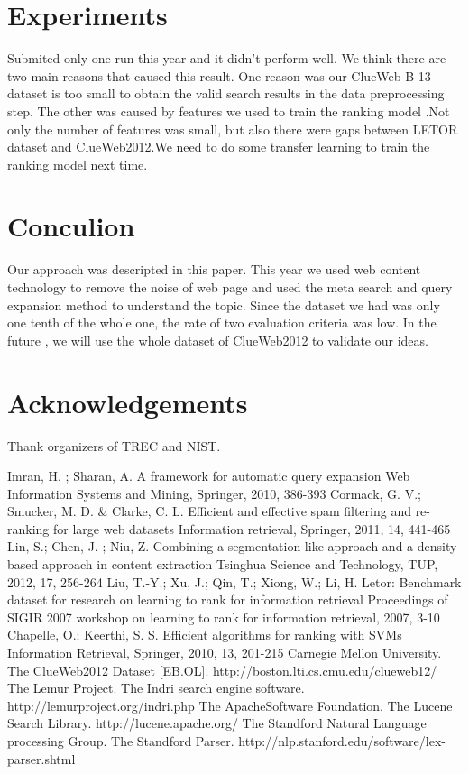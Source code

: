 \documentclass[runningheads,a4paper]{llncs}
\begin{document}
\section{Experiments}

Submited only one run this year and it didn't perform well. We think there are two main reasons that caused this result. One reason was our ClueWeb-B-13 dataset is too small to obtain the valid search results in the data preprocessing step. The other  was caused by features we used to train the ranking model .Not only the number of features was small, but also there were gaps between LETOR dataset and ClueWeb2012.We need to do some transfer learning  to train the ranking model next time.

\section{Conculion}

Our approach was descripted in this paper. This year we used web content technology to remove the noise of web page and used the meta search and query expansion method to understand the topic. Since the dataset we had was only one tenth of the whole one,  the rate of two evaluation criteria was low. In the future , we will use the whole dataset of ClueWeb2012 to validate our ideas.

\section{Acknowledgements}

Thank organizers of TREC and NIST.


\begin{thebibliography}{4}
Imran, H. ; Sharan, A. A framework for automatic query expansion Web Information Systems and Mining, Springer, 2010, 386-393
Cormack, G. V.; Smucker, M. D. \& Clarke, C. L. Efficient and effective spam filtering and re-ranking for large web datasets Information retrieval, Springer, 2011, 14, 441-465
Lin, S.; Chen, J. ; Niu, Z. Combining a segmentation-like approach and a density-based approach in content extraction Tsinghua Science and Technology, TUP, 2012, 17, 256-264
Liu, T.-Y.; Xu, J.; Qin, T.; Xiong, W.; Li, H. Letor: Benchmark dataset for research on learning to rank for information retrieval Proceedings of SIGIR 2007 workshop on learning to rank for information retrieval, 2007, 3-10
Chapelle, O.; Keerthi, S. S. Efficient algorithms for ranking with SVMs Information Retrieval, Springer, 2010, 13, 201-215
 Carnegie Mellon University. The ClueWeb2012 Dataset [EB.OL]. http://boston.lti.cs.cmu.edu/clueweb12/
 The Lemur Project. The Indri search engine software. http://lemurproject.org/indri.php
 The ApacheSoftware Foundation. The Lucene Search Library. http://lucene.apache.org/
 The Standford Natural Language processing Group. The Standford Parser. http://nlp.stanford.edu/software/lex-parser.shtml
\end{thebibliography}
\end{document}
